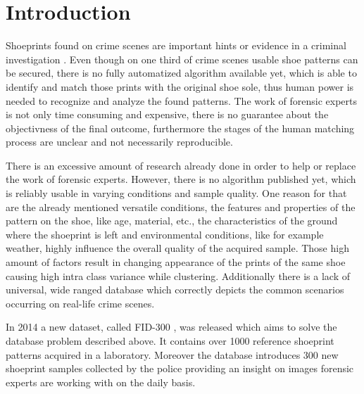 \documentclass[draft,final]{vutinfth} %
\begin{document}

\tableofcontents %

\mainmatter

\chapter{Introduction}

\par
Shoeprints found on crime scenes are important hints or evidence in a criminal investigation \cite{kong2014novel}.
Even though on one third \cite{alexandre1996computerized} of crime scenes usable shoe patterns can be secured, there is no fully automatized algorithm available yet, which is able to identify and match those prints with the original shoe sole, thus human power is needed \cite{wang2014automatic} to recognize and analyze the found patterns.
The work of forensic experts is not only time consuming and expensive, there is no guarantee about the objectivness of the final outcome\cite{gueham2008automatic}, furthermore the stages of the human matching process are unclear and not necessarily reproducible.
\par
There is an excessive amount of research already done \cite{rida2019forensic} in order to help or replace the work of forensic experts.
However, there is no algorithm published yet, which is reliably usable in varying conditions and sample quality.
One reason for that are the already mentioned versatile conditions, the features and properties of the pattern on the shoe, like age, material, etc., the characteristics of the ground where the shoeprint is left and environmental conditions, like for example weather, highly influence the overall quality of the acquired sample.
Those high amount of factors result in changing appearance of the prints of the same shoe causing high intra class variance while clustering.
Additionally there is a lack of universal, wide ranged database \cite{rida2019forensic} which correctly depicts the common scenarios occurring on real-life crime scenes.
\par
In 2014 a new dataset, called FID-300 \cite{kortylewski2014unsupervised}, was released which aims to solve the database problem described above.
It contains over 1000 reference shoeprint patterns acquired in a laboratory.
Moreover the database introduces 300 new shoeprint samples collected by the police providing an insight on images forensic experts are working with on the daily basis.
\end{document}
